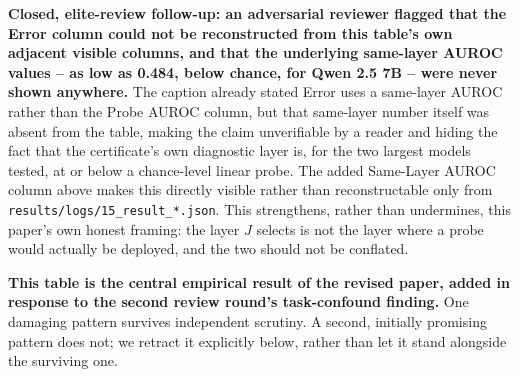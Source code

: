 \documentclass[10pt,twocolumn]{article}
\begin{document}
\textbf{Closed, elite-review follow-up: an adversarial reviewer flagged
that the Error column could not be reconstructed from this table's own
adjacent visible columns, and that the underlying same-layer AUROC
values -- as low as 0.484, below chance, for Qwen 2.5 7B -- were never
shown anywhere.} The caption already stated Error uses a same-layer
AUROC rather than the Probe AUROC column, but that same-layer number
itself was absent from the table, making the claim unverifiable by a
reader and hiding the fact that the certificate's own diagnostic layer
is, for the two largest models tested, at or below a chance-level
linear probe. The added Same-Layer AUROC column above makes this
directly visible rather than reconstructable only from
\texttt{results/logs/15\_result\_*.json}. This strengthens, rather than
undermines, this paper's own honest framing: the layer $J$ selects is
not the layer where a probe would actually be deployed, and the two
should not be conflated.

\textbf{This table is the central empirical result of the revised paper,
added in response to the second review round's task-confound finding.}
One damaging pattern survives independent scrutiny. A second, initially
promising pattern does not; we retract it explicitly below, rather than
let it stand alongside the surviving one.
\end{document}
